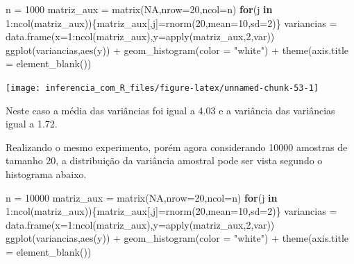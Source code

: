 \documentclass[
]{book}
\newenvironment{Shaded}{\begin{snugshade}}{\end{snugshade}}
\newcommand{\AttributeTok}[1]{\textcolor[rgb]{0.77,0.63,0.00}{#1}}
\newcommand{\ConstantTok}[1]{\textcolor[rgb]{0.00,0.00,0.00}{#1}}
\newcommand{\ControlFlowTok}[1]{\textcolor[rgb]{0.13,0.29,0.53}{\textbf{#1}}}
\newcommand{\DecValTok}[1]{\textcolor[rgb]{0.00,0.00,0.81}{#1}}
\newcommand{\FunctionTok}[1]{\textcolor[rgb]{0.00,0.00,0.00}{#1}}
\newcommand{\NormalTok}[1]{#1}
\newcommand{\OtherTok}[1]{\textcolor[rgb]{0.56,0.35,0.01}{#1}}
\newcommand{\SpecialCharTok}[1]{\textcolor[rgb]{0.00,0.00,0.00}{#1}}
\newcommand{\StringTok}[1]{\textcolor[rgb]{0.31,0.60,0.02}{#1}}
\begin{document}
\begin{Shaded}
\begin{Highlighting}[]
\NormalTok{n }\OtherTok{=} \DecValTok{1000}
\NormalTok{matriz\_aux }\OtherTok{=} \FunctionTok{matrix}\NormalTok{(}\ConstantTok{NA}\NormalTok{,}\AttributeTok{nrow=}\DecValTok{20}\NormalTok{,}\AttributeTok{ncol=}\NormalTok{n)}
\ControlFlowTok{for}\NormalTok{(j }\ControlFlowTok{in} \DecValTok{1}\SpecialCharTok{:}\FunctionTok{ncol}\NormalTok{(matriz\_aux))\{matriz\_aux[,j]}\OtherTok{=}\FunctionTok{rnorm}\NormalTok{(}\DecValTok{20}\NormalTok{,}\AttributeTok{mean=}\DecValTok{10}\NormalTok{,}\AttributeTok{sd=}\DecValTok{2}\NormalTok{)\}}
\NormalTok{variancias }\OtherTok{=} \FunctionTok{data.frame}\NormalTok{(}\AttributeTok{x=}\DecValTok{1}\SpecialCharTok{:}\FunctionTok{ncol}\NormalTok{(matriz\_aux),}\AttributeTok{y=}\FunctionTok{apply}\NormalTok{(matriz\_aux,}\DecValTok{2}\NormalTok{,var))}
\FunctionTok{ggplot}\NormalTok{(variancias,}\FunctionTok{aes}\NormalTok{(y)) }\SpecialCharTok{+}
  \FunctionTok{geom\_histogram}\NormalTok{(}\AttributeTok{color =} \StringTok{"white"}\NormalTok{) }\SpecialCharTok{+}
  \FunctionTok{theme}\NormalTok{(}\AttributeTok{axis.title =} \FunctionTok{element\_blank}\NormalTok{())}
\end{Highlighting}
\end{Shaded}

\begin{center}\texttt{[image: inferencia\_com\_R\_files/figure-latex/unnamed-chunk-53-1]} \end{center}

Neste caso a média das variâncias foi igual a 4.03 e a variância das variâncias igual a 1.72.

Realizando o mesmo experimento, porém agora considerando 10000 amostras de tamanho 20, a distribuição da variância amostral pode ser vista segundo o histograma abaixo.

\begin{Shaded}
\begin{Highlighting}[]
\NormalTok{n }\OtherTok{=} \DecValTok{10000}
\NormalTok{matriz\_aux }\OtherTok{=} \FunctionTok{matrix}\NormalTok{(}\ConstantTok{NA}\NormalTok{,}\AttributeTok{nrow=}\DecValTok{20}\NormalTok{,}\AttributeTok{ncol=}\NormalTok{n)}
\ControlFlowTok{for}\NormalTok{(j }\ControlFlowTok{in} \DecValTok{1}\SpecialCharTok{:}\FunctionTok{ncol}\NormalTok{(matriz\_aux))\{matriz\_aux[,j]}\OtherTok{=}\FunctionTok{rnorm}\NormalTok{(}\DecValTok{20}\NormalTok{,}\AttributeTok{mean=}\DecValTok{10}\NormalTok{,}\AttributeTok{sd=}\DecValTok{2}\NormalTok{)\}}
\NormalTok{variancias }\OtherTok{=} \FunctionTok{data.frame}\NormalTok{(}\AttributeTok{x=}\DecValTok{1}\SpecialCharTok{:}\FunctionTok{ncol}\NormalTok{(matriz\_aux),}\AttributeTok{y=}\FunctionTok{apply}\NormalTok{(matriz\_aux,}\DecValTok{2}\NormalTok{,var))}
\FunctionTok{ggplot}\NormalTok{(variancias,}\FunctionTok{aes}\NormalTok{(y)) }\SpecialCharTok{+}
  \FunctionTok{geom\_histogram}\NormalTok{(}\AttributeTok{color =} \StringTok{"white"}\NormalTok{) }\SpecialCharTok{+}
  \FunctionTok{theme}\NormalTok{(}\AttributeTok{axis.title =} \FunctionTok{element\_blank}\NormalTok{())}
\end{Highlighting}
\end{Shaded}
\end{document}
